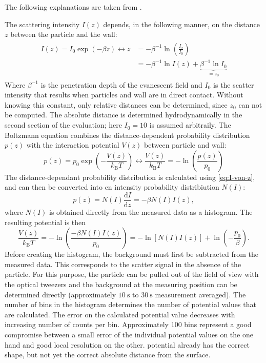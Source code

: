 \documentclass[.../bericht]{subfilies}
\begin{document}
        The following explanations are taken from \cite{anleitung}.

        The scattering intensity $I(z)$ depends, in the following manner, on the distance $z$ between the particle and the wall:
        \begin{align}
          \begin{split}
            I(z)=I_0\exp\left( -\beta z \right) \leftrightarrow z&=-\beta^{-1}\ln\left(\frac{I_z}{I_0}\right)\\
            &=-\beta^{-1}\ln I(z) + \underbrace{\beta^{-1}\ln I_0}_{=z_0}
          \end{split}
          \label{eq:I-von-z}
        \end{align}
        Where $\beta^{-1}$ is the penetration depth of the evanescent field and $I_0$ is the scatter intensity that results when particles and wall are in direct contact. Without knowing this constant, only relative distances can be determined, since $z_0$ can not be computed. The absolute distance is determined hydrodynamically in the second section of the evaluation; here $I_0 = 10$ is assumed arbitraily. The Boltzmann equation combines the distance-dependent probability distribution $p(z)$ with the interaction potential $V(z)$ between particle and wall:
        \begin{equation*}
          p(z)=p_0\exp\left( -\frac{V(z)}{k_\mathrm{B}T}\right) \leftrightarrow \frac{V(z)}{k_\mathrm{B}T}=-\ln\left(\frac{p(z)}{p_0}\right)
        \end{equation*}
        The distance-dependant probability distribution is calculated using \cref{eq:I-von-z}, and can then be converted into en intensity probability distribiution $N(I)$:
        \begin{equation*}
          p(z)=N(I)\frac{\mathrm{d}I}{\mathrm{d}z}=-\beta N(I)I(z),
        \end{equation*}
        where $N(I)$ is obtained directly from the measured data as a histogram. The resulting potential is then
        \begin{equation}
          \frac{V(z)}{k_\mathrm{B}T}=-\ln\left(\frac{-\beta N(I)I(z)}{p_0}\right)=-\ln\left[ N(I)I(z) \right]+\ln\left( -\frac{p_0}{\beta}\right).
          \label{eq:potential}
        \end{equation}
        Before creating the histogram, the background must first be subtracted from the measured data. This corresponds to the scatter signal in the absence of the particle. For this purpose, the particle can be pulled out of the field of view with the optical tweezers and the background at the measuring position can be determined directly (approximately $\SI{10}{\second}$ to $\SI{30}{\second}$ measurement averaged). The number of bins in the histogram determines the number of potential values that are calculated. The error on the calculated potential value decreases with increasing number of counts per bin. Approximately 100 bins represent a good compromise between a small error of the individual potential values on the one hand and good local resolution on the other.  potential already has the correct shape, but not yet the correct absolute distance from the surface.
\end{document}
